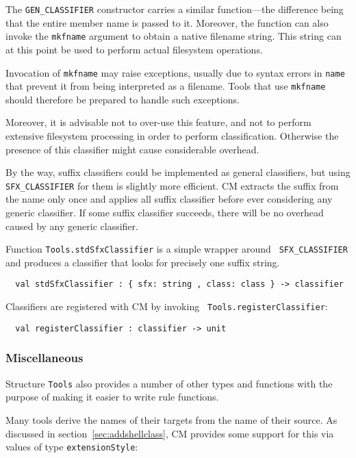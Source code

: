 The {\tt GEN\_CLASSIFIER} constructor carries a similar function---the
difference being that the entire member name is passed to it.
Moreover, the function can also invoke the {\tt mkfname} argument to
obtain a native filename string.  This string can at this point be
used to perform actual filesystem operations.

Invocation of {\tt mkfname} may raise exceptions, usually due to
syntax errors in {\tt name} that prevent it from being interpreted as
a filename.  Tools that use {\tt mkfname} should therefore be prepared
to handle such exceptions.

Moreover, it is advisable not to over-use this feature, and not to
perform extensive filesystem processing in order to perform
classification.  Otherwise the presence of this classifier might cause
considerable overhead.

By the way, suffix classifiers could be implemented as general
classifiers, but using {\tt SFX\_CLASSIFIER} for them is slightly more
efficient.  CM extracts the suffix from the name only once and applies
all suffix classifier before ever considering any generic classifier.
If some suffix classifier succeeds, there will be no overhead caused
by any generic classifier.

Function {\tt Tools.stdSfxClassifier} is a simple wrapper around {\tt
SFX\_CLASSIFIER} and produces a classifier that looks for precisely
one suffix string.

\begin{lstlisting}
  val stdSfxClassifier : { sfx: string , class: class } -> classifier
\end{lstlisting}%

Classifiers are registered with CM by invoking {\tt
Tools.registerClassifier}:

\begin{lstlisting}
  val registerClassifier : classifier -> unit
\end{lstlisting}%

\subsubsection{Miscellaneous}

Structure {\tt Tools} also provides a number of other types and
functions with the purpose of making it easier to write rule
functions.

 Many tools derive the names of
their targets from the name of their source.  As discussed in
section~\ref{sec:addshellclass}, CM provides some support for this via
values of type {\tt extensionStyle}:

